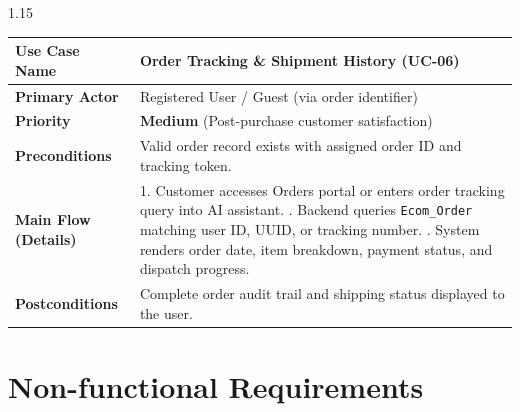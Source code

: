 \documentclass[12pt,a4paper]{article}
\begin{document}
{\begin{spacing}{1.15}
\begin{center}
\renewcommand{\arraystretch}{1.2}
\fontsize{10.5}{14}\selectfont
\begin{tabular}{|p{1.6in}|p{4.9in}|}
\hline
\textbf{Use Case Name} & Order Tracking \& Shipment History (\textbf{UC-06}) \\ \hline
\textbf{Primary Actor} & Registered User / Guest (via order identifier) \\ \hline
\textbf{Priority} & \textbf{Medium} (Post-purchase customer satisfaction) \\ \hline
\textbf{Preconditions} & Valid order record exists with assigned order ID and tracking token. \\ \hline
\textbf{Main Flow (Details)} &
1. Customer accesses Orders portal or enters order tracking query into AI assistant. \newline
2. Backend queries \texttt{Ecom\_Order} matching user ID, UUID, or tracking number. \newline
3. System renders order date, item breakdown, payment status, and dispatch progress. \\ \hline
\textbf{Postconditions} & Complete order audit trail and shipping status displayed to the user. \\ \hline
\end{tabular}
\end{center}

\end{spacing}
}

\vfill

\newpage



\section{Non-functional Requirements}

\vspace{0.08in}
\end{document}

